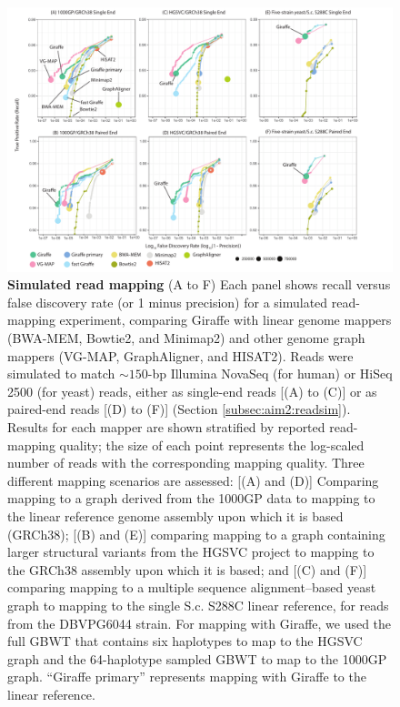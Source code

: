 \documentclass[11pt]{ucscthesis}
\begin{document}
\begin{figure}
    \centering
    \includegraphics[width=\linewidth]{aim2_fig2.pdf}
    \caption[Simulated read mapping]{\textbf{Simulated read mapping} (A to F) Each panel shows recall versus false discovery rate (or 1 minus precision) for a simulated read-mapping experiment, comparing Giraffe with linear genome mappers (BWA-MEM, Bowtie2, and Minimap2) and other genome graph mappers (VG-MAP, GraphAligner, and HISAT2). Reads were simulated to match $\sim150$-bp Illumina NovaSeq (for human) or HiSeq 2500 (for yeast) reads, either as single-end reads [(A) to (C)] or as paired-end reads [(D) to (F)] (Section \ref{subsec:aim2:readsim}). Results for each mapper are shown stratified by reported read-mapping quality; the size of each point represents the log-scaled number of reads with the corresponding mapping quality. Three different mapping scenarios are assessed: [(A) and (D)] Comparing mapping to a graph derived from the 1000GP data to mapping to the linear reference genome assembly upon which it is based (GRCh38); [(B) and (E)] comparing mapping to a graph containing larger structural variants from the HGSVC project to mapping to the GRCh38 assembly upon which it is based; and [(C) and (F)] comparing mapping to a multiple sequence alignment–based yeast graph to mapping to the single S.c. S288C linear reference, for reads from the DBVPG6044 strain. For mapping with Giraffe, we used the full GBWT that contains six haplotypes to map to the HGSVC graph and the 64-haplotype sampled GBWT to map to the 1000GP graph. “Giraffe primary” represents mapping with Giraffe to the linear reference.}
    \label{fig:aim2_fig2}
\end{figure}
\end{document}

